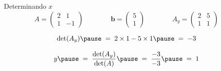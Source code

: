 \begin{resolution}{Determinando $x$}
  \[
    A =
    \begin{pmatrix}
      2 & 1  \\
      1 & -1
    \end{pmatrix}
  \qquad\qquad
    \mathbf{b} =
    \begin{pmatrix}
      5 \\
      1
    \end{pmatrix}
  \qquad\qquad
    A_y =
    \begin{pmatrix}
      2 & 5 \\
      1 & 1
    \end{pmatrix}
  \]

  \pause
  \[
    \det(A_y)
    \pause
    \;=\; 2 \times 1 - 5 \times 1
    \pause
    \;=\; -3
  \]

  \[
    y
    \pause
    \;=\; \frac{\det(A_y)}{\det(A)}
    \pause
    \;=\; \frac{-3}{-3}
    \pause
    \;=\; 1
  \]
\end{resolution}

\endinput
